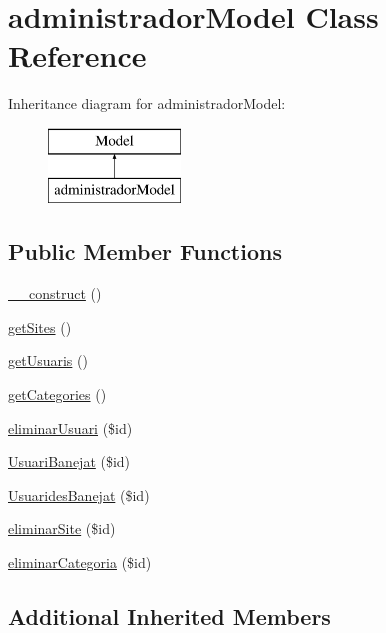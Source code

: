 \hypertarget{classadministrador_model}{}\section{administrador\+Model Class Reference}
\label{classadministrador_model}
Inheritance diagram for administrador\+Model\+:\begin{figure}[H]
\begin{center}
\leavevmode
\includegraphics[height=2.000000cm]{classadministrador_model}
\end{center}
\end{figure}
\subsection*{Public Member Functions}
\begin{DoxyCompactItemize}
\item 
\hyperlink{classadministrador_model_a095c5d389db211932136b53f25f39685}{\+\_\+\+\_\+construct} ()
\item 
\hyperlink{classadministrador_model_ab6f9b5403cf9de7de7b5916494516628}{get\+Sites} ()
\item 
\hyperlink{classadministrador_model_ae6ed92945c76a21439c8f46873bead13}{get\+Usuaris} ()
\item 
\hyperlink{classadministrador_model_a8729ba486702e7e12a3fff08965e1e7f}{get\+Categories} ()
\item 
\hyperlink{classadministrador_model_a3770680f7168ff17e7d3bbddc27bc5df}{eliminar\+Usuari} (\$id)
\item 
\hyperlink{classadministrador_model_ac9d26ea53762f0641d04edc63e240dd9}{Usuari\+Banejat} (\$id)
\item 
\hyperlink{classadministrador_model_abe679e9e8d662237b06086b4962d15fe}{Usuarides\+Banejat} (\$id)
\item 
\hyperlink{classadministrador_model_ace815abff98c1ce2c21b0402a857120d}{eliminar\+Site} (\$id)
\item 
\hyperlink{classadministrador_model_a2616775d2f8dc4aa3103033556633115}{eliminar\+Categoria} (\$id)
\end{DoxyCompactItemize}
\subsection*{Additional Inherited Members}



